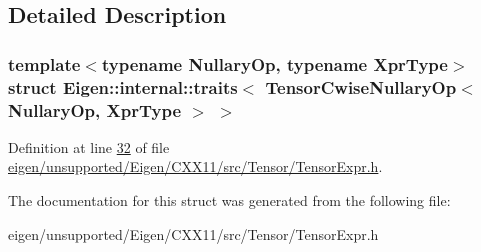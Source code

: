 \subsection{Detailed Description}
\subsubsection*{template$<$typename Nullary\+Op, typename Xpr\+Type$>$\newline
struct Eigen\+::internal\+::traits$<$ Tensor\+Cwise\+Nullary\+Op$<$ Nullary\+Op, Xpr\+Type $>$ $>$}



Definition at line \hyperlink{eigen_2unsupported_2_eigen_2_c_x_x11_2src_2_tensor_2_tensor_expr_8h_source_l00032}{32} of file \hyperlink{eigen_2unsupported_2_eigen_2_c_x_x11_2src_2_tensor_2_tensor_expr_8h_source}{eigen/unsupported/\+Eigen/\+C\+X\+X11/src/\+Tensor/\+Tensor\+Expr.\+h}.



The documentation for this struct was generated from the following file\+:\begin{DoxyCompactItemize}
\item 
eigen/unsupported/\+Eigen/\+C\+X\+X11/src/\+Tensor/\+Tensor\+Expr.\+h\end{DoxyCompactItemize}
